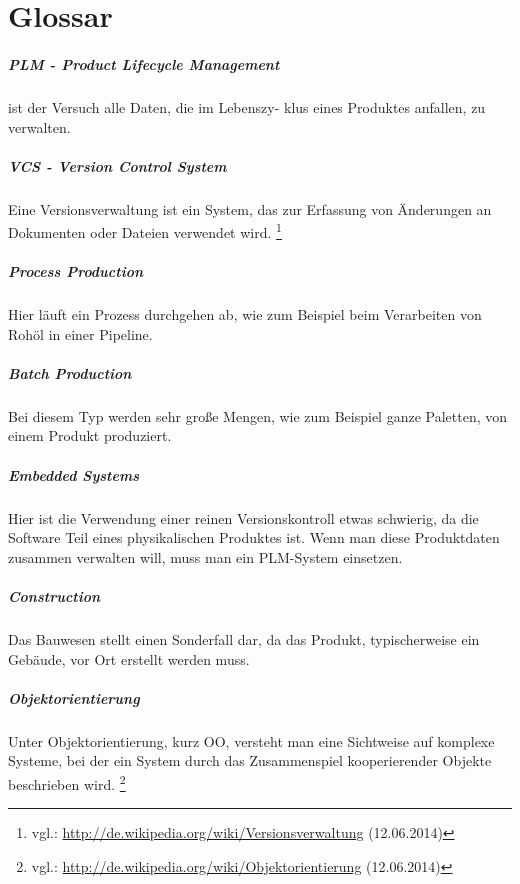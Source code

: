 \chapter{Glossar}

\paragraph{PLM - Product Lifecycle Management}
ist der Versuch alle Daten, die im Lebenszy- klus eines Produktes anfallen, zu verwalten.

\paragraph{VCS - Version Control System}
Eine Versionsverwaltung ist ein System, das zur Erfassung von Änderungen an Dokumenten oder Dateien verwendet wird. \footnote{vgl.: \url{http://de.wikipedia.org/wiki/Versionsverwaltung} (12.06.2014)}

\paragraph{Process Production}
Hier läuft ein Prozess durchgehen ab, wie zum Beispiel beim Verarbeiten von Rohöl in einer Pipeline.

\paragraph{Batch Production}
Bei diesem Typ werden sehr große Mengen, wie zum Beispiel ganze Paletten, von einem Produkt produziert.

\paragraph{Embedded Systems}
Hier ist die Verwendung einer reinen Versionskontroll etwas schwierig, da die Software Teil eines physikalischen Produktes ist. Wenn man diese Produktdaten zusammen verwalten will, muss man ein PLM-System einsetzen.

\paragraph{Construction}
Das Bauwesen stellt einen Sonderfall dar, da das Produkt, typischerweise ein Gebäude, vor Ort erstellt werden muss.

\paragraph{Objektorientierung}
Unter Objektorientierung, kurz OO, versteht man eine Sichtweise auf komplexe Systeme, bei der ein System durch das Zusammenspiel kooperierender Objekte beschrieben wird. \footnote{vgl.: \url{http://de.wikipedia.org/wiki/Objektorientierung} (12.06.2014)}

